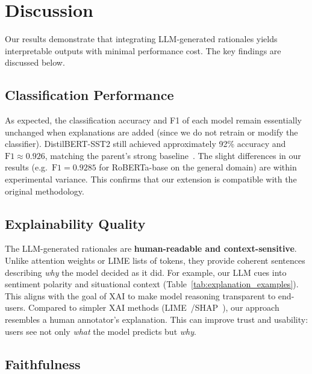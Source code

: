 
\section{Discussion}\label{sec:discussion}

Our results demonstrate that integrating LLM-generated rationales yields interpretable outputs with minimal performance cost. The key findings are discussed below.

\subsection{Classification Performance}\label{subsec:disc_performance}

As expected, the classification accuracy and F1 of each model remain essentially unchanged when explanations are added (since we do not retrain or modify the classifier). DistilBERT-SST2 still achieved approximately 92\% accuracy and $\text{F1} \approx 0.926$, matching the parent's strong baseline~\cite{oprea2025llm}. The slight differences in our results (e.g.\ $\text{F1} = 0.9285$ for RoBERTa-base on the general domain) are within experimental variance. This confirms that our extension is compatible with the original methodology.

\subsection{Explainability Quality}\label{subsec:disc_quality}

The LLM-generated rationales are \textbf{human-readable and context-sensitive}. Unlike attention weights or LIME lists of tokens, they provide coherent sentences describing \emph{why} the model decided as it did. For example, our LLM cues into sentiment polarity and situational context (Table~\ref{tab:explanation_examples}). This aligns with the goal of XAI to make model reasoning transparent to end-users. Compared to simpler XAI methods (LIME~\cite{ribeiro2016why}/SHAP~\cite{lundberg2017unified}), our approach resembles a human annotator's explanation. This can improve trust and usability: users see not only \emph{what} the model predicts but \emph{why}.

\subsection{Faithfulness}\label{subsec:disc_faithfulness}

